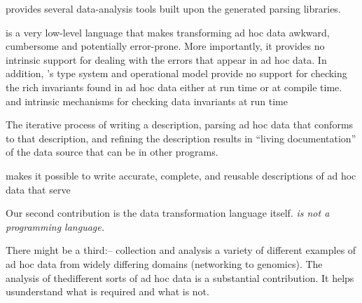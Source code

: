 {\pads{} provides several data-analysis tools
built upon the generated parsing libraries.

\C{} is a very low-level language that makes transforming ad hoc
data awkward, cumbersome and potentially error-prone.  More
importantly, it provides no intrinsic support for dealing with the
errors that appear in ad hoc data.  In addition, \C's type system and
operational model provide no support for checking the rich invariants
found in ad hoc data either at run time or at compile time.  and
intrinsic mechanisms for checking data invariants at run time

The iterative process of writing a \datatype{} description, parsing ad
hoc data that conforms to that description, and refining the
description results in ``living documentation'' of the data source
that can be in other \datatype{} programs.  

\datatype{} makes it possible to write accurate, complete, and
reusable descriptions of ad hoc data that serve 

Our second contribution is the data transformation language itself.
{\em \pads{} is not a programming language.}  
 
There might be a third:--
collection and analysis a variety of different examples of ad hoc
data from widely differing domains (networking to genomics).  The
analysis of thedifferent sorts of ad hoc data is a substantial
contribution.  It helps usunderstand what is required and what is not.
}
